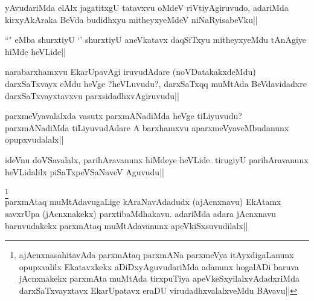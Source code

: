 
\begin{artha} 
yAvudariMda elAlx jagatitxgU tatavxvu oMdeV riVtiyAgiruvudo, adariMda 
kirxyAkAraka BeVda budidhxyu mitheyxyeMdeV niNaRyisabeVku||
\end{artha}


\begin{artha} 
``\stext" eMba shurxtiyU `\stext' shurxtiyU aneVkatavx daqSiTxyu 
mitheyxyeMdu tAnAgiye hiMde heVLide||
\end{artha}


\begin{artha} 
narabarxhamxvu EkarUpavAgi iruvudAdare (noVDatakakxdeMdu) darxSaTxvayx 
eMdu heVge ?heVLuvudu?, darxSaTxqq muMtAda BeVdavidadxre 
darxSaTxvayxtavxvu parxsidadhxvAgiruvudu||
\end{artha}


\begin{artha} 
parxmeVyavalalxda vasutx parxmANadiMda heVge tiLiyuvudu? parxmANadiMda 
tiLiyuvudAdare A barxhamxvu aparxmeVyaveMbudanunx opupxvudalalx||
\end{artha}


\begin{artha} 
ideVnu doVSavalalx, parihAravanunx hiMdeye heVLide. tirugiyU 
parihAravanunx heVLidalilx piSaTxpeVSaNaveV Aguvudu||
\end{artha}


\begin{artha} 
\footnote[1]{ajAcnxnasahitavAda parxmAtaq parxmANa parxmeVya 
itAyxdigaLanunx opupxvalilx Ekatavxkekx aDiDxyAguvudariMda adanunx 
hogalADi baruva jAcnxnakekx parxmAta muMtAda tirxpuTiya 
apeVkeSxyilalxvAdadxriMda darxSaTxvayxtavx EkarUpatavx eraDU 
virudadhxvalalxveMdu BAvavu||}\\
parxmAtaq muMtAdavugaLige kAraNavAdadudx (ajAcnxnavu) EkAtamx savxrUpa 
(jAcnxnakekx) parxtibaMdhakavu. adariMda adara jAcnxnavu baruvudakekx 
parxmAtaq muMtAdavanunx apeVkiSxsuvudilalx||
\end{artha}

